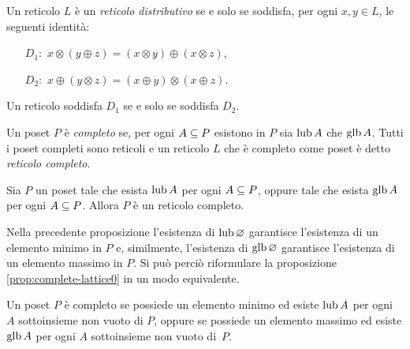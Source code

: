 \begin{definizione}
Un reticolo $L$ \`e un \emph{reticolo distributivo} se e solo se soddisfa,
per ogni $x, y \in L$, le seguenti identit\`a:
\begin{itemize}
\item[$D_1:$] $x \otimes (y \oplus   z) = (x \otimes y) \oplus  (x \otimes z)$,
\item[$D_2:$] $x \oplus  (y \otimes  z) = (x \oplus  y) \otimes (x \oplus  z)$.
\end{itemize}
\end{definizione}

\begin{proposizione}
{\rm \cite{BurrisS81}} Un reticolo soddisfa $D_1$ se e solo se soddisfa $D_2$.
\end{proposizione}

\begin{definizione}
Un poset $P$ \`e \emph{completo} se, per ogni $A \subseteq P$ esistono in $P$ sia
$\mathop{\mathrm{lub}}\nolimits A$ che $\mathop{\mathrm{glb}}\nolimits A$. Tutti i poset completi sono reticoli e un reticolo
$L$ che \`e completo come poset \`e detto \emph{reticolo completo}.
\end{definizione}

\begin{proposizione}
\label{prop:complete-lattice0}
\textup{\cite{BurrisS81}}
Sia $P$ un poset tale che esista $\mathop{\mathrm{lub}}\nolimits A$ per ogni $A \subseteq P$,
oppure tale che esista $\mathop{\mathrm{glb}}\nolimits A$ per ogni $A \subseteq P$.
Allora $P$ \`e un reticolo completo.
\end{proposizione}

Nella precedente proposizione l'esistenza di $\mathop{\mathrm{lub}}\nolimits \varnothing$ garantisce
l'esistenza di un elemento minimo in $P$ e, similmente, l'esistenza di
$\mathop{\mathrm{glb}}\nolimits \varnothing$ garantisce l'esistenza di un elemento massimo in $P$.
Si pu\`o perci\`o riformulare la proposizione \ref{prop:complete-lattice0}
in un modo equivalente.

\begin{proposizione}
\label{prop:complete-lattice}
\textup{\cite{BurrisS81}} Un poset $P$ \`e completo se possiede un elemento minimo
ed esiste $\mathop{\mathrm{lub}}\nolimits A$ per ogni $A$ sottoinsieme non vuoto di $P$, oppure se
possiede un elemento massimo ed esiste $\mathop{\mathrm{glb}}\nolimits A$ per ogni $A$ sottoinsieme non
vuoto di~$P$.
\end{proposizione}

